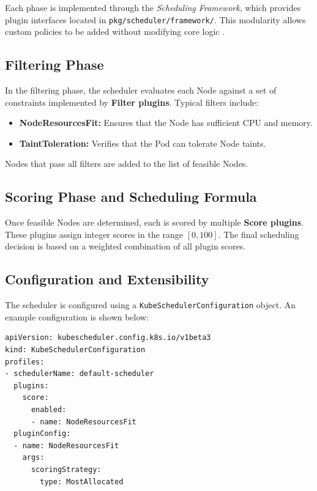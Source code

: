 \documentclass{article}
\begin{document}
Each phase is implemented through the \textit{Scheduling Framework}, which provides plugin interfaces located in \texttt{pkg/scheduler/framework/}. This modularity allows custom policies to be added without modifying core logic \cite{scheduling-framework-proposal}.

\subsection{Filtering Phase}

In the filtering phase, the scheduler evaluates each Node against a set of constraints implemented by \textbf{Filter plugins}.  
Typical filters include:

\begin{itemize}
  \item \textbf{NodeResourcesFit:} Ensures that the Node has sufficient CPU and memory.
  \item \textbf{TaintToleration:} Verifies that the Pod can tolerate Node taints.
\end{itemize}

Nodes that pass all filters are added to the list of feasible Nodes.

\subsection{Scoring Phase and Scheduling Formula}

Once feasible Nodes are determined, each is scored by multiple \textbf{Score plugins}.  
These plugins assign integer scores in the range $[0, 100]$.  
The final scheduling decision is based on a weighted combination of all plugin scores.

\subsection{Configuration and Extensibility}

The scheduler is configured using a \texttt{KubeSchedulerConfiguration} object.  
An example configuration is shown below:

\begin{verbatim}
apiVersion: kubescheduler.config.k8s.io/v1beta3
kind: KubeSchedulerConfiguration
profiles:
- schedulerName: default-scheduler
  plugins:
    score:
      enabled:
      - name: NodeResourcesFit
  pluginConfig:
  - name: NodeResourcesFit
    args:
      scoringStrategy:
        type: MostAllocated
\end{verbatim}
\end{document}
